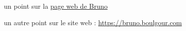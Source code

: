   \item un point sur la \href{http://cristal.univ-lille.fr/~beaufils}{page web de Bruno}
  \item un autre point sur le site web : \url{https://bruno.boulgour.com}
